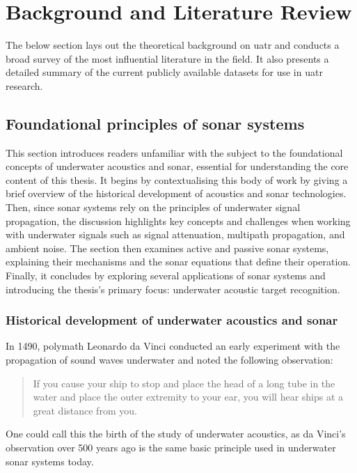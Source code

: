 \chapter{Background and Literature Review}

The below section lays out the theoretical background on \acrfull{uatr} and conducts a broad survey of the most influential literature in the field. It also presents a detailed summary of the current publicly available datasets for use in \acrshort{uatr} research.

\section{Foundational principles of sonar systems}

This section introduces readers unfamiliar with the subject to the foundational concepts of underwater acoustics and sonar, essential for understanding the core content of this thesis. It begins by contextualising this body of work by giving a brief overview of the historical development of acoustics and sonar technologies. Then, since sonar systems rely on the principles of underwater signal propagation, the discussion highlights key concepts and challenges when working with underwater signals such as signal attenuation, multipath propagation, and ambient noise. The section then examines active and passive sonar systems, explaining their mechanisms and the sonar equations that define their operation. Finally, it concludes by exploring several applications of sonar systems and introducing the thesis's primary focus: underwater acoustic target recognition.

\subsection{Historical development of underwater acoustics and sonar}\label{sec:uw-history}

In 1490, polymath Leonardo da Vinci conducted an early experiment with the propagation of sound waves underwater and noted the following observation:
\begin{quote}
    If you cause your ship to stop and place the head of a long tube in the water and place the outer extremity to your ear, you will hear ships at a great distance from you. \cite{urick_principles_1975}
\end{quote}
One could call this the birth of the study of underwater acoustics, as da Vinci's observation over 500 years ago is the same basic principle used in underwater sonar systems today.

